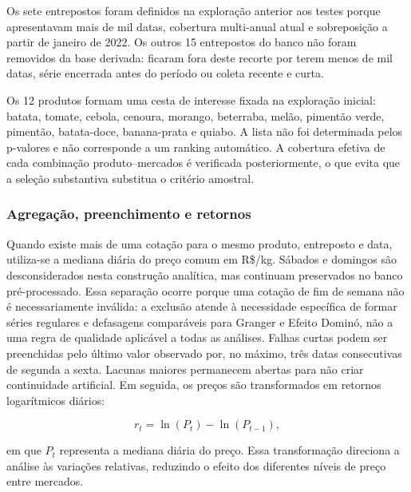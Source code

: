 \documentclass[12pt,a4paper]{article}
\begin{document}
Os sete entrepostos foram definidos na exploração anterior aos testes porque
apresentavam mais de mil datas, cobertura multi-anual atual e sobreposição a
partir de janeiro de 2022. Os outros 15 entrepostos do banco não foram removidos
da base derivada: ficaram fora deste recorte por terem menos de mil datas,
série encerrada antes do período ou coleta recente e curta.

Os 12 produtos formam uma cesta de interesse fixada na exploração inicial:
batata, tomate, cebola, cenoura, morango, beterraba, melão, pimentão verde,
pimentão, batata-doce, banana-prata e quiabo. A lista não foi determinada pelos
p-valores e não corresponde a um ranking automático. A cobertura efetiva de
cada combinação produto--mercados é verificada posteriormente, o que evita que
a seleção substantiva substitua o critério amostral.

\subsubsection{Agregação, preenchimento e retornos}

Quando existe mais de uma cotação para o mesmo produto, entreposto e data,
utiliza-se a mediana diária do preço comum em R\$/kg. Sábados e domingos são
desconsiderados nesta construção analítica, mas continuam preservados no banco
pré-processado. Essa separação ocorre porque uma cotação de fim de semana não é
necessariamente inválida: a exclusão atende à necessidade específica de formar
séries regulares e defasagens comparáveis para Granger e Efeito Dominó, não a
uma regra de qualidade aplicável a todas as análises. Falhas curtas podem ser
preenchidas pelo último valor observado por, no máximo, três datas consecutivas
de segunda a sexta. Lacunas maiores permanecem abertas para não criar
continuidade artificial. Em seguida, os preços são transformados em retornos
logarítmicos diários:

\begin{equation}
    r_t = \ln(P_t) - \ln(P_{t-1}),
\end{equation}

\noindent em que $P_t$ representa a mediana diária do preço. Essa transformação
direciona a análise às variações relativas, reduzindo o efeito dos diferentes
níveis de preço entre mercados.
\end{document}
